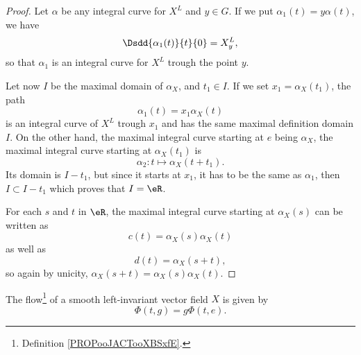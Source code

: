 \begin{proof}
    Let \( \alpha\) be any integral curve for \( X^L\) and \( y\in G\). If we put \( \alpha_1(t)=y\alpha(t)\), we have
    \begin{equation}
        \Dsdd{ \alpha_1(t) }{t}{0}=X^L_y,
    \end{equation}
    so that \( \alpha_1\) is an integral curve for \( X^L\) trough the point \( y\).

    Let now \( I\) be the maximal domain of \( \alpha_X\), and \( t_1\in I\). If we set \( x_1=\alpha_X(t_1)\), the path
    \begin{equation}
         \alpha_1(t)=x_1\alpha_X(t)
    \end{equation}
    is an integral curve of \( X^L\) trough \( x_1\) and has the same maximal definition domain \( I\). On the other hand, the maximal integral curve starting at \( e\) being \( \alpha_X\), the maximal integral curve starting at \( \alpha_X(t_1)\) is
    \begin{equation}
        \alpha_2\colon t\mapsto \alpha_X(t+t_1).
    \end{equation}
    Its domain is \( I-t_1\), but since it starts at \( x_1\), it has to be the same as \( \alpha_1\), then \( I\subset I-t_1\) which proves that \( I=\eR\).

    For each \( s\) and \( t\) in \( \eR\), the maximal integral curve starting at \( \alpha_X(s)\) can be written as
    \begin{equation}
        c(t)=\alpha_X(s)\alpha_X(t)
    \end{equation}
    as well as
    \begin{equation}
        d(t)=\alpha_X(s+t),
    \end{equation}
    so again by unicity, \( \alpha_X(s+t)=\alpha_X(s)\alpha_X(t)\).
\end{proof}

\begin{proposition} \label{PROPooUXFQooIwimav}
    The flow\footnote{Definition \ref{PROPooJACTooXBSxfE}.} of a smooth left-invariant vector field \( X\) is given by
    \begin{equation}
        \Phi(t,g)=g\Phi(t,e).
    \end{equation}
\end{proposition}

